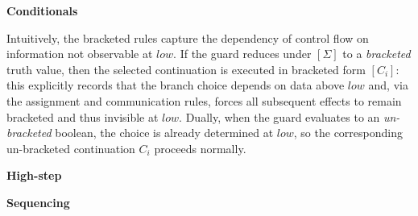 \documentclass[12pt,a4paper,twoside]{book}
\begin{document}
\noindent\textbf{Conditionals}
\begin{mathpar}



\end{mathpar}

Intuitively, the bracketed rules capture the dependency of control flow on information not observable at \(low\). If the guard reduces under \([\Sigma]\) to a \emph{bracketed} truth value, then the selected continuation is executed in bracketed form \([C_i]\): this explicitly records that the branch choice depends on data above \(low\) and, via the assignment and communication rules, forces all subsequent effects to remain bracketed and thus invisible at \(low\). Dually, when the guard evaluates to an \emph{un-bracketed} boolean, the choice is already determined at \(low\), so the corresponding un-bracketed continuation \(C_i\) proceeds normally.

\noindent\textbf{High-step}
\begin{mathpar}

\end{mathpar}

\noindent\textbf{Sequencing}
\begin{mathpar}

\end{mathpar}
\end{document}
